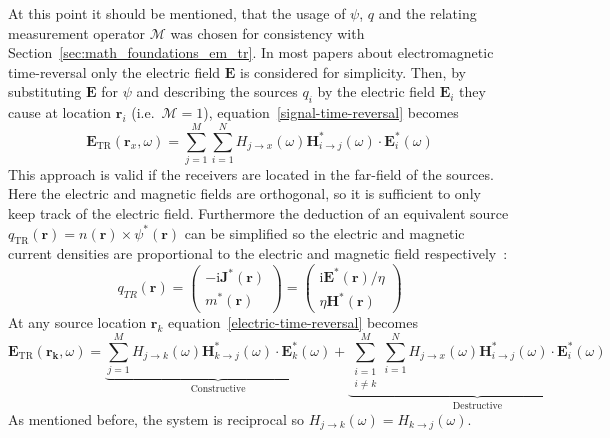 At this point it should be mentioned, that the usage of \(\psi \), \(q\) and the relating measurement operator \(\mathcal{M}\) was chosen for consistency with Section~\ref{sec:math_foundations_em_tr}.
In most papers about electromagnetic time-reversal only the electric field \(\bm{E}\) is considered for simplicity.
Then, by substituting \(\bm{E}\) for \(\psi \) and describing the sources \(q_i\) by the electric field \(\bm{E}_i\) they cause at location \(\bm{r}_i\) (i.e.~\(\mathcal{M}=1\)), equation~\eqref{signal-time-reversal} becomes
\begin{equation}\label{electric-time-reversal}
    \bm{E}_{\text{TR}}(\bm{r}_x, \omega) = \sum_{j=1}^{M} \sum_{i=1}^{N} H_{j\rightarrow x}(\omega )  \bm{H}^*_{i\rightarrow j}(\omega) \cdot \bm{E}^*_i(\omega)
\end{equation}
This approach is valid if the receivers are located in the far-field of the sources.
Here the electric and magnetic fields are orthogonal, so it is sufficient to only keep track of the electric field.
Furthermore the deduction of an equivalent source \(q_{\text{TR}}(\bm{r}) = n(\bm{r}) \times \psi^*(\bm{r})\) can be simplified so the electric and magnetic current densities are proportional to the electric and magnetic field respectively~\parencite{de_rosny_theory_2010}:
\begin{equation}
    q_{T R}(\bm{r})= \begin{pmatrix}
        -\mathrm{i} \bm{J}^*(\bm{r}) \\
        m^*(\bm{r})
    \end{pmatrix} =\left(\begin{array}{c}
        \mathrm{i} \bm{E}^*(\bm{r}) / \eta \\
        \eta \bm{H}^*(\bm{r})
        \end{array}\right)
\end{equation}
At any source location \(\bm{r}_k\) equation~\eqref{electric-time-reversal} becomes
\begin{equation}\label{electric-time-reversal-source}
    \bm{E}_{\text{TR}}(\bm{r_k}, \omega) = \underbrace{\sum_{j=1}^{M} H_{j\rightarrow k}(\omega) \bm{H}^*_{k\rightarrow j}(\omega) \cdot \bm{E}^*_k(\omega)}_{\text{Constructive}} + \underbrace{\sum_{\substack{i=1 \\ i \neq k}}^{M} \sum_{i=1}^{N} H_{j\rightarrow x}(\omega ) \bm{H}^*_{i\rightarrow j}(\omega) \cdot \bm{E}^*_i(\omega)}_{\text{Destructive}}
\end{equation}
As mentioned before, the system is reciprocal so \(H_{j\rightarrow k}(\omega )= H_{k\rightarrow j}(\omega )\). 
